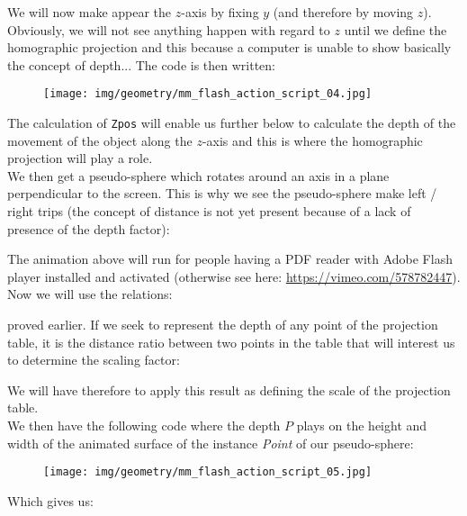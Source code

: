 	\begin{tcolorbox}[colframe=black,colback=white,sharp corners]
	\begin{center}
	\centering
	\end{center}
	We will now make appear the $z$-axis by fixing $y$ (and therefore by moving $z$). Obviously, we will not see anything happen with regard to $z$ until we define the homographic projection and this because a computer is unable to show basically the concept of depth... The code is then written:
	\begin{figure}[H]
		\centering
		\texttt{[image: img/geometry/mm\_flash\_action\_script\_04.jpg]}
	\end{figure}
	\end{tcolorbox}
	
	\begin{tcolorbox}[colframe=black,colback=white,sharp corners]
	The calculation of \texttt{Zpos} will enable us further below to calculate the depth of the movement of the object along the $z$-axis and this is where the homographic projection will play a role.\\
	
	We then get a pseudo-sphere which rotates around an axis in a plane perpendicular to the screen. This is why we see the pseudo-sphere make left / right trips (the concept of distance is not yet present because of a lack of presence of the depth factor):
	\begin{center}
	\centering
	\end{center}
	The animation above will run for people having a PDF reader with Adobe Flash player installed and activated (otherwise see here: \url{https://vimeo.com/578782447}).\\
	
	Now we will use the relations:
	
	proved earlier. If we seek to represent the depth of any point of the projection table, it is the distance ratio between two points in the table that will interest us to determine the scaling factor:
	
	\end{tcolorbox}
	
	\begin{tcolorbox}[colframe=black,colback=white,sharp corners]
	We will have therefore to apply this result as defining the scale of the projection table.\\

	We then have the following code where the depth $P$ plays on the height and width of the animated surface of the instance \textit{Point} of our pseudo-sphere:
	\begin{figure}[H]
		\centering
		\texttt{[image: img/geometry/mm\_flash\_action\_script\_05.jpg]}
	\end{figure}
	Which gives us:
	\begin{center}
	\centering
	\end{center}
	\end{tcolorbox}
	
